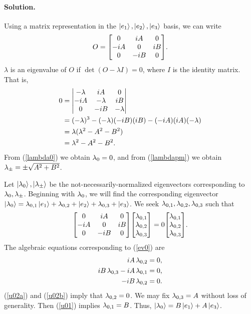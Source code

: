 \documentclass[11pt]{article}
\newcommand{\refeq}[1]{(\ref{#1})}
\newenvironment{solution}
{
    \paragraph{Solution.}
    \ignorespaces
}
{
    \bigskip\bigskip
}
\begin{document}
\begin{solution}
	Using a matrix representation in the $\ket{e_1}, \ket{e_2}, \ket{e_3}$ basis, we can write
	\begin{equation}
		O = \mqty[0 & iA & 0 \\ -iA & 0 & iB \\ 0 & -iB & 0].
	\end{equation}
	$\lambda$ is an eigenvalue of $O$ if $\det(O - \lambda I) = 0$, where $I$ is the identity matrix.  That is,
	\begin{align}
		0 &= \mdet{-\lambda & iA & 0 \\ -iA & -\lambda & iB \\ 0 & -iB & -\lambda} \\
		&= (-\lambda)^3 - (-\lambda)(-iB)(iB) - (-iA)(iA)(-\lambda) \\
		&= \lambda(\lambda^2 - A^2 - B^2) \label{lambda0} \\
		&= \lambda^2 - A^2 - B^2 \label{lambdapm}.
	\end{align}
	From \refeq{lambda0} we obtain $\lambda_0 = 0$, and from \refeq{lambdapm} we obtain $\lambda_\pm = \pm \sqrt{A^2 + B^2}$.

	Let $\ket{\lambda_0}, \ket{\lambda_\pm}$ be the not-necessarily-normalized eigenvectors corresponding to $\lambda_0, \lambda_\pm$.  Beginning with $\lambda_0$, we will find the corresponding eigenvector $\ket{\lambda_0} = \lambda_{0,1} \ket{e_1} + \lambda_{0,2} + \ket{e_2} + \lambda_{0,3} + \ket{e_3}$.  We seek $\lambda_{0,1}, \lambda_{0,2}, \lambda_{0,3}$ such that
	\begin{equation} \label{ev0}
		\mqty[0 & iA & 0 \\ -iA & 0 & iB \\ 0 & -iB & 0] \mqty[\uoq \\ \uow \\ \uoe] = 0 \mqty[\uoq \\ \uow \\ \uoe].
	\end{equation}
	The algebraic equations corresponding to \refeq{ev0} are
	\begin{align}
		iA \,\lambda_{0,2} &= 0, \label{u02a} \\
		iB \,\lambda_{0,3} - iA \,\lambda_{0,1} &= 0, \label{u01} \\
		-iB \,\lambda_{0,2} &= 0. \label{u02b}
	\end{align}
	\refeq{u02a} and \refeq{u02b} imply that $\lambda_{0,2} = 0$.  We may fix $\lambda_{0,3} = A$ without loss of generality.  Then \refeq{u01} implies $\lambda_{0,1} = B$.  Thus, $\ket{\lambda_0} = B \ket{e_1} + A \ket{e_3}$.


\end{solution}
\end{document}
